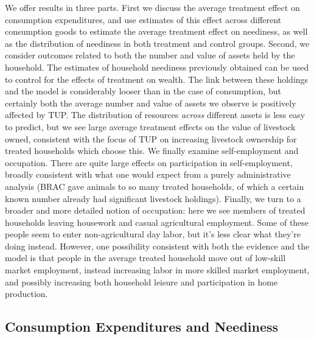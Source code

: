 \documentclass[11pt]{article}
\begin{document}
We offer results in three parts.  First we discuss the average
treatment effect on consumption expenditures, and use estimates of
this effect across different consumption goods to estimate the average
treatment effect on neediness, as well as the distribution of
neediness in both treatment and control groups.  Second, we consider
outcomes related to both the number and value of assets held by the
household.  The estimates of household neediness previously obtained
can be used to control for the effects of treatment on wealth.  The
link between these holdings and the model is considerably looser than
in the case of consumption, but certainly both the average number and
value of assets we observe is positively affected by TUP.  The
distribution of resources \emph{across} different assets is less easy to
predict, but we see large average treatment effects on the value of
livestock owned, consistent with the focus of TUP on increasing
livestock ownership for treated households which choose this.  We
finally examine self-employment and occupation.  There are quite large
effects on participation in self-employment, broadly consistent with
what one would expect from a purely administrative analysis (BRAC gave
animals to so many treated households, of which a certain known number
already had significant livestock holdings).  Finally, we turn to a
broader and more detailed notion of occupation: here we see members of
treated households leaving housework and casual agricultural
employment.  Some of these people seem to enter non-agricultural day
labor, but it's less clear what they're doing instead.  However, one
possibility consistent with both the evidence and the model is that
people in the average treated household move out of low-skill market
employment, instead increasing labor in more skilled market
employment, and possibly increasing both household leisure and
participation in home production.

\subsection*{Consumption Expenditures and Neediness}
\label{sec-6-1}
\end{document}
